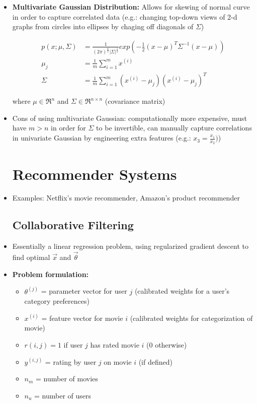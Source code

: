 \documentclass[titlepage]{article}
\begin{document}
\begin{itemize}
\begin{table} [h]
\begin{tabular}{p{8cm}|p{8cm}}
	\end{tabular}
\end{table}

\item \textbf{Multivariate Gaussian Distribution:} Allows for skewing of normal curve in order to capture correlated data (e.g.: changing top-down views of 2-d graphs from circles into ellipses by chaging off diagonals of $\Sigma$)

\begin{align*}
	p(x;\mu,\Sigma) &= \frac{1}{(2\pi)^{\frac{n}{2}} | \Sigma|^{\frac{1}{2}}} exp \left(-\frac{1}{2}
	(x-\mu)^T\Sigma^{-1} (x-\mu) \right)\\
	\mu_j&= \frac{1}{m} \sum_{i=1}^m x^{(i)}\\
	\Sigma &= \frac{1}{m} \sum_{i=1}^m (x^{(i)}-\mu_j)(x^{(i)}-\mu_j)^T
\end{align*}

where $\mu \in \Re^n$ and $\Sigma \in \Re^{n \times n}$ (covariance matrix)

\item Cons of using multivariate Gaussian: computationally more expensive, must have $m>n$ in order for $\Sigma$ to be invertible, can manually capture correlations in univariate Gaussian by engineering extra features (e.g.: $x_3 = \frac{x_1}{x_2})$)

\section{Recommender Systems}
\item Examples: Netflix's movie recommender, Amazon's product recommender
\subsection{Collaborative Filtering}
\item Essentially a linear regression problem, using regularized gradient descent to find optimal $\vec x$ and $\vec \theta$
\item \textbf{Problem formulation:}
\begin{itemize}[label = $\bullet$]
	\item $\theta^{(j)}$ = parameter vector for user $j$ (calibrated weights for a user's category preferences)
	\item $x^{(i)}$ = feature vector for movie $i$ (calibrated weights for categorization of movie)
	\item $r(i,j) =1$ if user $j$ has rated movie $i$ (0 otherwise)
	\item $y^{(i,j)}$ = rating by user $j$ on movie $i$ (if defined)
	\item $n_m$ = number of movies
	\item $n_u$ = number of users
\end{itemize}


\end{itemize}
\end{document}
